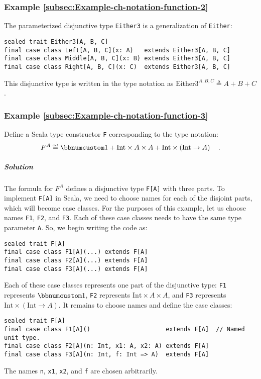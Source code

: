 \subsubsection{Example \label{subsec:Example-ch-notation-function-2}\ref{subsec:Example-ch-notation-function-2}}

The parameterized disjunctive type \lstinline!Either3! is a generalization
of \lstinline!Either!:
\begin{lstlisting}
sealed trait Either3[A, B, C]
final case class Left[A, B, C](x: A)   extends Either3[A, B, C]
final case class Middle[A, B, C](x: B) extends Either3[A, B, C]
final case class Right[A, B, C](x: C)  extends Either3[A, B, C]
\end{lstlisting}
This disjunctive type is written in the type notation as $\text{Either3}^{A,B,C}\triangleq A+B+C$.

\subsubsection{Example \label{subsec:Example-ch-notation-function-3}\ref{subsec:Example-ch-notation-function-3}}

Define a Scala type constructor \lstinline!F! corresponding to the
type notation:
\[
F^{A}\triangleq\bbnum 1+\text{Int}\times A\times A+\text{Int}\times\left(\text{Int}\rightarrow A\right)\quad.
\]


\subparagraph{Solution}

The formula for $F^{A}$ defines a disjunctive type \lstinline!F[A]!
with three parts. To implement \lstinline!F[A]! in Scala, we need
to choose names for each of the disjoint parts, which will become
case classes. For the purposes of this example, let us choose names
\lstinline!F1!, \lstinline!F2!, and \lstinline!F3!. Each of these
case classes needs to have the same type parameter \lstinline!A!.
So, we begin writing the code as:
\begin{lstlisting}
sealed trait F[A]
final case class F1[A](...) extends F[A]
final case class F2[A](...) extends F[A]
final case class F3[A](...) extends F[A]
\end{lstlisting}
Each of these case classes represents one part of the disjunctive
type: \lstinline!F1! represents $\bbnum 1$, \lstinline!F2! represents
$\text{Int}\times A\times A$, and \lstinline!F3! represents $\text{Int}\times\left(\text{Int}\rightarrow A\right)$.
It remains to choose names and define the case classes:
\begin{lstlisting}
sealed trait F[A]
final case class F1[A]()                     extends F[A]  // Named unit type.
final case class F2[A](n: Int, x1: A, x2: A) extends F[A]
final case class F3[A](n: Int, f: Int => A)  extends F[A]
\end{lstlisting}
The names \lstinline!n!, \lstinline!x1!, \lstinline!x2!, and \lstinline!f!
are chosen arbitrarily.

